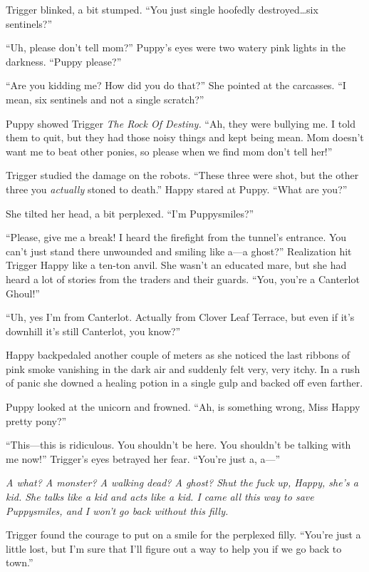 Trigger blinked, a bit stumped. ``You just single hoofedly destroyed\dots six sentinels?''

``Uh, please don't tell mom?'' Puppy's eyes were two watery pink lights in the darkness. ``Puppy please?''

``Are you kidding me? How did you do that?'' She pointed at the carcasses. ``I mean, six sentinels and not a single scratch?''

Puppy showed Trigger \emph{The Rock Of Destiny.}\/ ``Ah, they were bullying me. I told them to quit, but they had those noisy things and kept being mean. Mom doesn't want me to beat other ponies, so please when we find mom don't tell her!''

Trigger studied the damage on the robots. ``These three were shot, but the other three you \emph{actually}\/ stoned to death.'' Happy stared at Puppy. ``What are you?''

She tilted her head, a bit perplexed. ``I'm Puppysmiles?''

``Please, give me a break! I heard the firefight from the tunnel's entrance. You can't just stand there unwounded and smiling like a---a ghost?'' Realization hit Trigger Happy like a ten-ton anvil. She wasn't an educated mare, but she had heard a lot of stories from the traders and their guards. ``You, you're a Canterlot Ghoul!''

``Uh, yes I'm from Canterlot. Actually from Clover Leaf Terrace, but even if it's downhill it's still Canterlot, you know?''

Happy backpedaled another couple of meters as she noticed the last ribbons of pink smoke vanishing in the dark air and suddenly felt very, very itchy. In a rush of panic she downed a healing potion in a single gulp and backed off even farther.

Puppy looked at the unicorn and frowned. ``Ah, is something wrong, Miss Happy pretty pony?''

``This---this is ridiculous. You shouldn't be here. You shouldn't be talking with me now!'' Trigger's eyes betrayed her fear. ``You're just a, a---''

\emph{A what? A monster? A walking dead? A ghost? Shut the fuck up, Happy, she's a kid. She talks like a kid and acts like a kid. I came all this way to save Puppysmiles, and I won't go back without this filly.}

Trigger found the courage to put on a smile for the perplexed filly. ``You're just a little lost, but I'm sure that I'll figure out a way to help you if we go back to town.''


